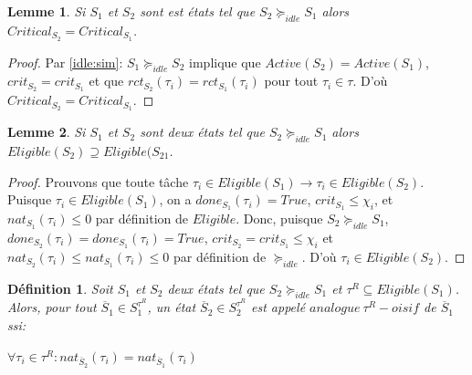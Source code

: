 \documentclass[11pt,a4paper,oneside]{book}
\theoremstyle{break}
\newtheorem{defin}{Définition}
\theoremstyle{breakplain}
\newtheorem{lem}{Lemme}
\begin{document}
\begin{lem}
\label{idle:criteq}
Si $S_1$ et $S_2$ sont est états tel que $S_2 \succeq_{idle} S_1$ alors $Critical_{S_2} = Critical_{S_1}$.
\end{lem}
\begin{proof} Par \autoref{idle:sim}: $S_1 \succeq_{idle} S_2$ implique que $Active(S_2) = Active(S_1)$, $crit_{S_2} = crit_{S_1}$ et que $rct_{S_2}(\tau_i) = rct_{S_1}(\tau_i)$ pour tout $\tau_i \in \tau$. D'où $Critical_{S_2} = Critical_{S_1}$.
\end{proof}





\begin{lem}
\label{idle:elisuper}
Si $S_1$ et $S_2$ sont deux états tel que $S_2 \succeq_{idle}S_1$ alors $Eligible(S_2) \supseteq Eligible(S_21$.
\end{lem}
\begin{proof} Prouvons que toute tâche $\tau_i \in Eligible(S_1) \rightarrow \tau_i \in Eligible(S_2)$. Puisque $\tau_i \in Eligible(S_1)$, on a $done_{S_1}(\tau_i) = True$,  $crit_{S_1} \leq \chi_i$, et $nat_{S_1}(\tau_i) \leq 0$ par définition de $Eligible$. Donc, puisque $S_2 \succeq_{idle}S_1$, $done_{S_2}(\tau_i) = done_{S_1}(\tau_i) = True$,  $crit_{S_2} = crit_{S_1} \leq \chi_i$ et $nat_{S_2}(\tau_i) \leq nat_{S_1}(\tau_i) \leq 0$ par définition de $\succeq_{idle}$. D'où $\tau_i \in Eligible(S_2)$.
\end{proof}

\begin{defin}
\label{idle:reqanalogue}
Soit $S_1$ et $S_2$ deux états tel que $S_2 \succeq_{idle} S_1$ et $\tau^R \subseteq Eligible(S_1)$. Alors, pour tout $\overline{S}_1\in S_1^{\tau^R}$, un état  $\overline{S}_2\in S_2^{\tau^R}$ est appelé $analogue\ \tau^R-oisif$ de $\overline{S}_1$ ssi:
\begin{center}
$\forall \tau_i \in \tau^R : nat_{\overline{S}_2}(\tau_i) = nat_{\overline{S}_1}(\tau_i) $
\end{center}
\end{defin}
\end{document}
